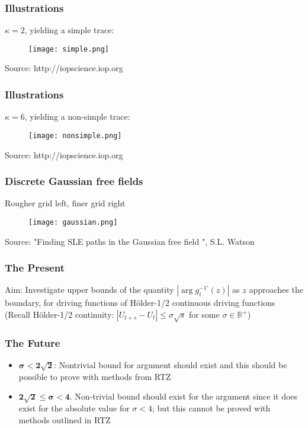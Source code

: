 \documentclass[10pt, compress]{beamer}
\begin{document}
\begin{frame}[fragile]
  \frametitle{Illustrations}
$\kappa=2$, yielding a simple trace:
\begin{figure}
  \centering
 \texttt{[image: simple.png]}
\end{figure}
\small
Source: http://iopscience.iop.org
\normalsize
\end{frame}

\begin{frame}[fragile]
  \frametitle{Illustrations}
$\kappa=6$, yielding a non-simple trace:
\begin{figure}
  \centering
 \texttt{[image: nonsimple.png]}
\end{figure}
\small
Source: http://iopscience.iop.org
\normalsize
\end{frame}

\begin{frame}[fragile]
  \frametitle{Discrete Gaussian free fields}
Rougher grid left, finer grid right
\begin{figure}
  \centering
 \texttt{[image: gaussian.png]}
\end{figure}
\small
Source: "Finding SLE paths in the Gaussian free field ", S.L. Watson
\normalsize
\end{frame}

\begin{frame}[fragile]
  \frametitle{The Present}
Aim: Investigate upper bounds of the quantity $|\arg g^{-1 \prime}_{t}(z)|$ as $z$ approaches the boundary, for driving functions of H\"older-1/2 continuous driving functions\\

(Recall H\"older-1/2 continuity: $|U_{t+s}-U_{t}| \leq \sigma \sqrt{s}$ for some $\sigma \in \mathbb{R}^{+}$)


\end{frame}

\begin{frame}[fragile]
  \frametitle{The Future}
\begin{itemize}
\item $\boldsymbol{\sigma<2\sqrt{2}}$: Nontrivial bound for argument should exist and this should be possible to prove with methods from RTZ\\

\item $\boldsymbol{2\sqrt{2} \leq \sigma < 4}$. Non-trivial bound should exist for the argument since it does exist for the absolute value for $\sigma <4$; but this cannot be proved with methods outlined in RTZ
\end{itemize}
\end{frame}
\end{document}
